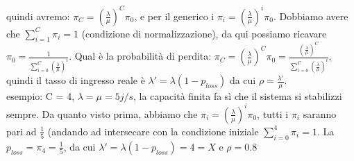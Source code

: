 \documentclass{article}
\begin{document}
quindi avremo: $\pi_C = (\frac{\lambda}{\mu})^C \pi_0$, e per il generico i $\pi_i = (\frac{\lambda}{\mu})^i \pi_0$. Dobbiamo avere che $\sum\limits_{i=1}^{C} \pi_i = 1$ (condizione di normalizzazione), da qui possiamo ricavare $\pi_0 = \frac{1}{\sum\limits_{i=0}^{C} (\frac{\lambda}{\mu})^i}$. Qual è la probabilità di perdita: $\pi_C = (\frac{\lambda}{\mu})^C \pi_0 = \frac{(\frac{\lambda}{\mu})^C}{\sum\limits_{i=0}^{C} (\frac{\lambda}{\mu})^i}$, quindi il tasso di ingresso reale è $\lambda' = \lambda(1 - p_{loss})$ da cui $\rho = \frac{\lambda'}{\mu}$.\\ esempio: C = 4, $\lambda = \mu = 5 j/s$, la capacità finita fa sì che il sistema si stabilizzi sempre. Da quanto visto prima, abbiamo che $\pi_i = (\frac{\lambda}{\mu})^i \pi_0$, tutti i $\pi_i$ saranno pari ad $\frac{1}{5}$ (andando ad intersecare con la condizione iniziale $\sum\limits_{i=0}^{4} \pi_i = 1$. La $p_{loss} = \pi_4 = \frac{1}{5}$, da cui $\lambda' = \lambda(1 - p_{loss}) = 4 = X$ e $\rho = 0.8$
\end{document}
